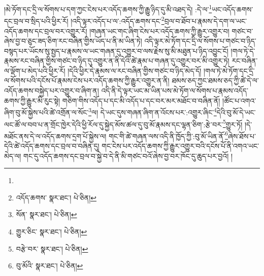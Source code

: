 །མེ་ཏོག་དང་དྲི་ལ་སོགས་པ་དག་ཀྱང་ངེས་པར་འདོད་ཆགས་ཀྱི་རྒྱུ་ཉིད་དུ་མི་འཐད་དེ། :དེ་ལ་\footnote{}ཡང་འདོད་ཆགས་དང་བྲལ་བ་སྲིད་པའི་ཕྱིར་རོ། །འདི་ལྟར་འདོད་པ་ལ་:འདོད་ཆགས་དང་\footnote{འདོད་ཆགས་  སྣར་ཐང་།  པེ་ཅིན། }བྲལ་བ་ཐོབ་པ་རྣམས་དེ་དག་ལ་ཡང་འདོད་ཆགས་དང་བྲལ་བར་འགྱུར་རོ། །གཞན་ཡང་གང་ཞིག་ངེས་པར་འདོད་ཆགས་ཀྱི་རྒྱུར་འགྱུར་བ། གཙང་བ་ཞེས་བྱ་བ་ཅུང་ཟད་ཅིག་རང་བཞིན་གྱིས་ཡོད་པ་ནི་མ་ཡིན་ཏེ། འདི་ལྟར་མེ་ཏོག་དང་དྲི་ལ་སོགས་པ་གཙང་བ་ཉིད་བསྙད་པར་ཡོངས་སུ་སྤྱད་པ་རྣམས་ལ་ཡང་གཞན་དུ་འགྱུར་བ་ལས་རྗེས་སུ་མི་མཐུན་པ་ཉིད་འབྱུང་ངོ། །གལ་ཏེ་དེ་རྣམས་རང་བཞིན་གྱིས་གཙང་བ་ཉིད་དུ་འགྱུར་ན་ནི་དེའི་ཚེ་རྣམ་པ་གཞན་དུ་འགྱུར་བར་མི་འགྱུར་ཏེ། རང་བཞིན་ལ་ལྡོག་པ་མེད་པའི་ཕྱིར་རོ། །དེའི་ཕྱིར་དེ་རྣམས་ལ་རང་བཞིན་གྱིས་གཙང་བ་ཉིད་མེད་དོ། །གལ་ཏེ་མེ་ཏོག་དང་དྲི་ལ་སོགས་པའི་དངོས་པོ་རྣམས་ངེས་པར་འདོད་ཆགས་ཀྱི་རྒྱུར་འགྱུར་ན་ནི། ཐམས་ཅད་ཀྱང་ཐམས་ཅད་ཀྱི་ཚེ་དེ་ལ་འདོད་ཆགས་བསྐྱེད་པར་འགྱུར་བ་ཞིག་ན། འདི་ནི་དེ་ལྟར་ཡང་མ་ཡིན་པས་མེ་ཏོག་ལ་སོགས་པ་རྣམས་འདོད་ཆགས་ཀྱི་རྒྱུར་མི་རུང་སྟེ། གཅིག་གིས་འདོད་པ་དང་མི་འདོད་པ་དང་བར་མར་མཐོང་བ་བཞིན་ནོ། །ཚོང་པ་འགའ་ཞིག་བུ་མོ་སྐྱེས་པའི་ཚེ་འགྲོན་ལ་སོང་\footnote{སོན་  སྣར་ཐང་།  པེ་ཅིན། }ལ། དེ་ཡང་དུས་གཞན་ཞིག་ན་འོངས་པར་:འགྱུར་ཞིང་\footnote{གྱུར་ཅིང་  སྣར་ཐང་།  པེ་ཅིན། }དེའི་བུ་མོ་དེ་ཡང་ལང་ཚོ་ལ་བབ་པ་ན་གྲོང་ཁྱེར་དེའི་ཕྱི་རོལ་དུ་སྐྱེད་མོས་ཚལ་དུ་བུ་མོ་རྣམས་དང་ལྷན་ཅིག་:རྩེ་བར་\footnote{བརྩེ་བར་  སྣར་ཐང་།  པེ་ཅིན། }གྱུར་ཏོ། །དེ་མཐོང་ནས་དེ་ལ་འདོད་ཆགས་དྲག་པོ་སྐྱེས་ལ། གང་གི་ཚེ་གཞན་ལས་འདི་ནི་ཁྱོད་ཀྱི་:བུ་མོ་ཡིན་ནོ་\footnote{བུ་མོའི་  སྣར་ཐང་།  པེ་ཅིན། }ཞེས་ཐོས་པ་དེའི་ཚེ་འདོད་ཆགས་དང་བྲལ་བ་བཞིན་དུ། གང་ངེས་པར་འདོད་ཆགས་ཀྱི་རྒྱུར་འགྱུར་བའི་དངོས་པོ་ནི་འགའ་ཡང་མེད་ལ། གང་དུ་འདོད་ཆགས་དང་བྲལ་བ་སྐྱེ་བ་དེ་ནི་མི་གཙང་བའོ་ཞེས་བྱ་བར་ཁོང་དུ་ཆུད་པར་བྱའོ། །
